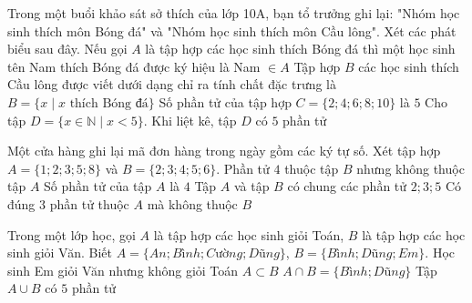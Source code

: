 
\begin{ex}%
	Trong một buổi khảo sát sở thích của lớp 10A, bạn tổ trưởng ghi lại: "Nhóm học sinh thích môn Bóng đá" và "Nhóm học sinh thích môn Cầu lông". Xét các phát biểu sau đây.
	\choiceTF
		{\True Nếu gọi $A$ là tập hợp các học sinh thích Bóng đá thì một học sinh tên Nam thích Bóng đá được ký hiệu là Nam $\in A$}
		{Tập hợp $B$ các học sinh thích Cầu lông được viết dưới dạng chỉ ra tính chất đặc trưng là $B=\{x \mid x \text{ thích Bóng đá}\}$}
		{\True Số phần tử của tập hợp $C=\{2;4;6;8;10\}$ là $5$}
		{\True Cho tập $D=\{x\in\mathbb{N} \mid x<5\}$. Khi liệt kê, tập $D$ có $5$ phần tử}
\end{ex}

\begin{ex}%
	Một cửa hàng ghi lại mã đơn hàng trong ngày gồm các ký tự số. Xét tập hợp $A=\{1;2;3;5;8\}$ và $B=\{2;3;4;5;6\}$.
	\choiceTF
		{\True Phần tử $4$ thuộc tập $B$ nhưng không thuộc tập $A$}
		{Số phần tử của tập $A$ là $4$}
		{\True Tập $A$ và tập $B$ có chung các phần tử $2;3;5$}
		{\True Có đúng $3$ phần tử thuộc $A$ mà không thuộc $B$}
\end{ex}

\begin{ex}%
	Trong một lớp học, gọi $A$ là tập hợp các học sinh giỏi Toán, $B$ là tập hợp các học sinh giỏi Văn. Biết $A=\{An; Bình; Cường; Dũng\}$, $B=\{Bình; Dũng; Em\}$.
	\choiceTF
		{\True Học sinh Em giỏi Văn nhưng không giỏi Toán}
		{$A \subset B$}
		{\True $A \cap B=\{Bình; Dũng\}$}
		{\True Tập $A \cup B$ có $5$ phần tử}
\end{ex}

